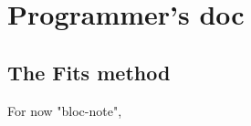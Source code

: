 










\part{Programmer's doc}

























\COM
{
\chapter{The Fits method}

For now "bloc-note",

}


